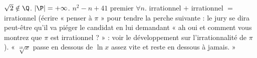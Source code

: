 \markdownRendererUlItem $\sqrt 2 \notin \Q$.\markdownRendererUlItemEnd 
\markdownRendererUlItem $| \P | = +\infty$.\markdownRendererUlItemEnd 
\markdownRendererUlEndTight \markdownRendererInterblockSeparator
{}
\markdownRendererSectionEnd \markdownRendererSectionBegin
{}\markdownRendererInterblockSeparator
{}\markdownRendererUlBeginTight
\markdownRendererUlItem $n^2-n+41$ premier $\forall n$.\markdownRendererUlItemEnd 
\markdownRendererUlItem irrationnel $+$ irrationnel $=$ irrationnel (écrire « penser à $\pi$ » pour tendre la perche suivante : le jury se dira peut-être qu'il va piéger le candidat en lui demandant « ah oui et comment vous montrez que $\pi$ est irrationnel ? » : voir le développement sur l'irrationnalité de $\pi$).\markdownRendererUlItemEnd 
\markdownRendererUlItem « $\sqrt[10]{x}$ passe en dessous de $\ln x$ assez vite et reste en dessous à jamais. »\markdownRendererUlItemEnd 
\markdownRendererUlEndTight 
\markdownRendererSectionEnd \markdownRendererDocumentEnd